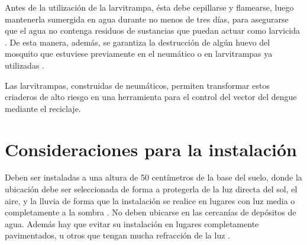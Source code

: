 Antes de la utilización de la larvitrampa, ésta debe cepillarse y flamearse, luego mantenerla
sumergida en agua durante no menos de tres días, para asegurarse que el agua no contenga residuos
de sustancias que puedan actuar como larvicida \cite{manualControlArg2009}. De esta manera,
además, se garantiza la destrucción de algún huevo del mosquito que estuviese previamente en el
neumático o en larvitrampas ya utilizadas \cite{manualControlArg2009}.

Las larvitrampas, construidas de neumáticos, permiten transformar estos criaderos de alto riesgo
en una herramienta para el control del vector del dengue mediante el reciclaje.

\section{Consideraciones para la instalación}
Deben ser instaladas a una altura de 50 centímetros de la base del suelo, donde la ubicación debe
ser seleccionada de forma a protegerla de la luz directa del sol, el aire, y la lluvia de forma
que la instalación se realice en lugares con luz media o completamente a la sombra
\cite{manualControlArg2009}. No deben ubicarse en las cercanías de depósitos de agua. Además hay
que evitar su instalación en lugares completamente pavimentados, u otros que tengan mucha
refracción de la luz \cite{manualControlArg2009}.

